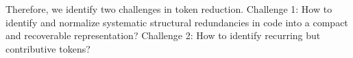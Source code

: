 Therefore, we identify two challenges in token reduction. Challenge 1:
How to identify and normalize systematic structural redundancies in code into a
compact and recoverable representation? Challenge 2: How to identify
recurring but contributive tokens?



